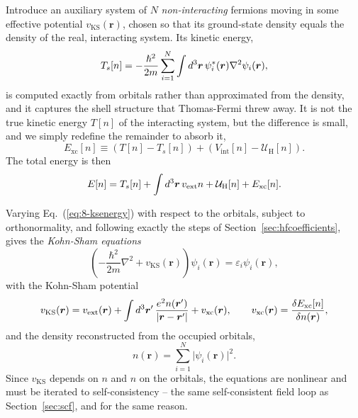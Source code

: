 Introduce an auxiliary system of $N$ \emph{non-interacting} fermions moving
in some effective potential $v_{\mathrm{KS}}(\bm{r})$, chosen so that its
ground-state density equals the density of the real, interacting system.  Its
kinetic energy,
\begin{equation}
  T_s[n] = -\frac{\hslash^2}{2m}\sum_{i=1}^{N}
    \int d^3\bm{r}\,\psi^{*}_i(\bm{r})\nabla^2\psi_i(\bm{r}),
  \label{eq:8-Ts}
\end{equation}
is computed exactly from orbitals rather than approximated from the density,
and it captures the shell structure that Thomas-Fermi threw away.  It is not
the true kinetic energy $T[n]$ of the interacting system, but the difference
is small, and we simply redefine the remainder to absorb it,
\begin{equation}
  E_{\mathrm{xc}}[n] \equiv \left(T[n]-T_s[n]\right)
    + \left(V_{\mathrm{int}}[n]-\mathcal{U}_{\mathrm{H}}[n]\right).
  \label{eq:8-excdefinition}
\end{equation}
The total energy is then
\begin{equation}
  E[n] = T_s[n]
    + \int d^3\bm{r}\,v_{\mathrm{ext}}n
    + \mathcal{U}_{\mathrm{H}}[n]
    + E_{\mathrm{xc}}[n].
  \label{eq:8-ksenergy}
\end{equation}

Varying Eq.~(\ref{eq:8-ksenergy}) with respect to the orbitals, subject to
orthonormality, and following exactly the steps of
Section~\ref{sec:hfcoefficients}, gives the \emph{Kohn-Sham equations}
\begin{equation}
  \boxed{\;
  \left(-\frac{\hbar^2}{2m}\nabla^2
    + v_{\mathrm{KS}}(\bm{r})\right)\psi_i(\bm{r})
   = \varepsilon_i\psi_i(\bm{r}),
  \;}
  \label{eq:8-kohnsham}
\end{equation}
with the Kohn-Sham potential
\begin{equation}
  v_{\mathrm{KS}}(\bm{r}) = v_{\mathrm{ext}}(\bm{r})
    + \int d^3\bm{r}'\,\frac{e^2 n(\bm{r}')}{\vert\bm{r}-\bm{r}'\vert}
    + v_{\mathrm{xc}}(\bm{r}),
  \qquad
  v_{\mathrm{xc}}(\bm{r})
   = \frac{\delta E_{\mathrm{xc}}[n]}{\delta n(\bm{r})} ,
  \label{eq:8-kspotential}
\end{equation}
and the density reconstructed from the occupied orbitals,
\begin{equation}
  n(\bm{r}) = \sum_{i=1}^{N}\vert\psi_i(\bm{r})\vert^2 .
  \label{eq:8-ksdensity}
\end{equation}
Since $v_{\mathrm{KS}}$ depends on $n$ and $n$ on the orbitals, the equations
are nonlinear and must be iterated to self-consistency -- the same
self-consistent field loop as Section~\ref{sec:scf}, and for the same reason.

